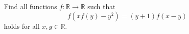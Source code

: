 Find all functions $f:\mathbb{R}\to\mathbb{R}$ such that$$f(xf(y)-y^2)=(y+1)f(x-y)$$holds for all $x,y\in\mathbb{R}$.